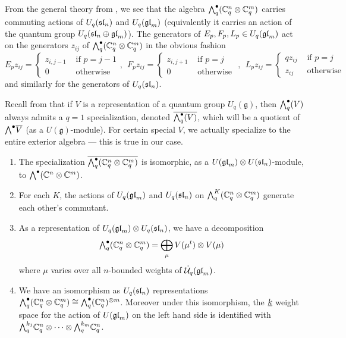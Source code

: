 \documentclass[11pt]{amsart}
\begin{document}
From the general theory from \cite{BZ}, we see that the algebra $ \Alt{\bullet}{q}(\bC_q^n \otimes \bC_q^m) $ carries commuting actions of $ U_q(\sl_n) $ and $ U_q(\gl_m) $ (equivalently it carries an action of the quantum group $ U_q(\sl_n \oplus \gl_m) $).  The generators of $E_p, F_p, L_p \in U_q(\gl_m) $ act on the generators $ z_{ij} $ of $\Alt{\bullet}{q}(\bC_q^n \otimes \bC_q^m) $ in the obvious fashion
$$ E_p z_{ij} = \begin{cases} z_{i,j-1} & \text{ if } p = j-1  \\
 0 & \text{  otherwise }
 \end{cases}, \ \
F_p z_{ij} = \begin{cases} z_{i,j+1} & \text{ if } p = j \\
 0 & \text{ otherwise }
 \end{cases}, \ \
L_p z_{ij} = \begin{cases} q z_{ij} & \text{ if } p = j \\
z_{ij} & \text{ otherwise }
\end{cases}$$
and similarly for the generators of $ U_q(\sl_n) $.

Recall from \cite{BZ} that if $ V $ is a representation of a quantum group $ U_q(\mathfrak{g}) $, then $ \Alt{\bullet}{q}(V) $ always admits a $ q=1 $ specialization, denoted $ \overline{\Alt{\bullet}{q}(V)}$, which will be a quotient of $ \Alt{\bullet}{} \overline{V} $ (as a $U(\mathfrak{g})$-module). For certain special $ V $, we actually specialize to the entire exterior algebra --- this is true in our case.

\begin{thm} \label{th:qSkewHowe}\mbox{}
\begin{enumerate}
\item The specialization $\overline{\Alt{\bullet}{q}(\bC_q^n \otimes \bC_q^m)} $ is isomorphic, as a $U(\gl_m) \otimes U(\sl_n)$-module, to $ \Alt{\bullet}{}(\bC^n \otimes \bC^m) $.
\item For each $ K $, the actions of $ U_q(\gl_m) $ and $ U_q(\sl_n) $ on $ \Alt{K}{q}(\bC_q^n \otimes \bC_q^m) $ generate each other's commutant.
\item As a representation of $ U_q(\gl_m) \otimes U_q(\sl_n)  $, we have a decomposition
$$ \Alt{\bullet}{q} (\mathbb C^n_q \otimes \mathbb C^m_q) = \bigoplus_{\mu} V(\mu^t) \otimes V(\mu) $$
 where $\mu$ varies over all $n$-bounded weights of $ \dU(\gl_m)$.
\item We have an isomorphism as $ U_q(\sl_n) $ representations
$ \Alt{\bullet}{q}(\mathbb C^n_q \otimes \mathbb C^m_q) \cong \Alt{\bullet}{q}(\bC_q^n)^{\otimes m} $.  Moreover under this isomorphism, the $ \ul{k} $ weight space for the action of $ U(\gl_m) $ on the left hand side is identified with $\Alt{k_1}{q} \mathbb C_q^n \otimes \cdots \otimes \Alt{k_m}{q} \mathbb C_q^n$.
\end{enumerate}
\end{thm}
\end{document}
